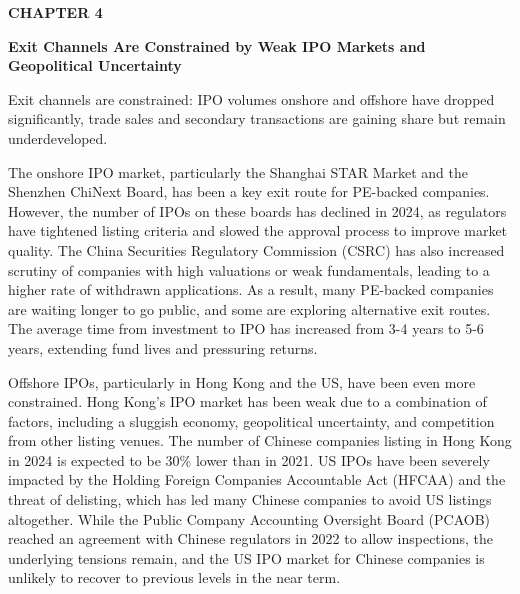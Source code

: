 \documentclass[10pt,a4paper]{article}
\begin{document}
\clearpage
\label{chap:4}
{\textcolor{BOBlue}{\scriptsize\bfseries CHAPTER 4}}\par\vspace{-1pt}
{\Large\sffamily\bfseries\color{BONavy} Exit Channels Are Constrained by Weak IPO Markets and Geopolitical Uncertainty}\par\vspace{4pt}
{\textcolor{BOBlue}{\normalsize Exit channels are constrained: IPO volumes onshore and offshore have dropped significantly, trade sales and secondary transactions are gaining share but remain underdeveloped.}}\par\vspace{3pt}
\begin{minipage}[t]{0.58\linewidth}
{\small The onshore IPO market, particularly the Shanghai STAR Market and the Shenzhen ChiNext Board, has been a key exit route for PE-backed companies. However, the number of IPOs on these boards has declined in 2024, as regulators have tightened listing criteria and slowed the approval process to improve market quality. The China Securities Regulatory Commission (CSRC) has also increased scrutiny of companies with high valuations or weak fundamentals, leading to a higher rate of withdrawn applications. As a result, many PE-backed companies are waiting longer to go public, and some are exploring alternative exit routes. The average time from investment to IPO has increased from 3-4 years to 5-6 years, extending fund lives and pressuring returns.}\par
{\small Offshore IPOs, particularly in Hong Kong and the US, have been even more constrained. Hong Kong's IPO market has been weak due to a combination of factors, including a sluggish economy, geopolitical uncertainty, and competition from other listing venues. The number of Chinese companies listing in Hong Kong in 2024 is expected to be 30\% lower than in 2021. US IPOs have been severely impacted by the Holding Foreign Companies Accountable Act (HFCAA) and the threat of delisting, which has led many Chinese companies to avoid US listings altogether. While the Public Company Accounting Oversight Board (PCAOB) reached an agreement with Chinese regulators in 2022 to allow inspections, the underlying tensions remain, and the US IPO market for Chinese companies is unlikely to recover to previous levels in the near term.}\par

\end{minipage}
\end{document}
